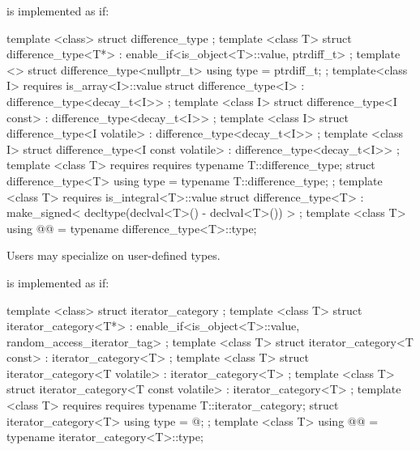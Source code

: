 \begin{addedblock}
\pnum
{}%
 is implemented as if:

%
\begin{codeblock}
  template <class> struct difference_type { };
  template <class T>
  struct difference_type<T*>
    : enable_if<is_object<T>::value, ptrdiff_t> { };
  template <>
  struct difference_type<nullptr_t> {
    using type = ptrdiff_t;
  };
  template<class I>
    requires is_array<I>::value
  struct difference_type<I> : difference_type<decay_t<I>{}> { };
  template <class I>
  struct difference_type<I const> : difference_type<decay_t<I>> { };
  template <class I>
  struct difference_type<I volatile> : difference_type<decay_t<I>> { };
  template <class I>
  struct difference_type<I const volatile> : difference_type<decay_t<I>> { };
  template <class T>
    requires requires { typename T::difference_type; }
  struct difference_type<T> {
    using type = typename T::difference_type;
  };
  template <class T>
    requires is_integral<T>::value
  struct difference_type<T>
    : make_signed< decltype(declval<T>() - declval<T>()) > {
  };
  template <class T>
    using @@ = typename difference_type<T>::type;
\end{codeblock}


\pnum
Users may specialize  on user-defined types.

\pnum
{}%
is implemented as if:

%
\begin{codeblock}
  template <class> struct iterator_category { };
  template <class T>
  struct iterator_category<T*>
    : enable_if<is_object<T>::value, random_access_iterator_tag> { };
  template <class T>
  struct iterator_category<T const> : iterator_category<T> { };
  template <class T>
  struct iterator_category<T volatile> : iterator_category<T> { };
  template <class T>
  struct iterator_category<T const volatile> : iterator_category<T> { };
  template <class T>
    requires requires { typename T::iterator_category; }
  struct iterator_category<T> {
    using type = @\seebelow@;
  };
  template <class T>
    using @@ = typename iterator_category<T>::type;
\end{codeblock}


\end{addedblock}

